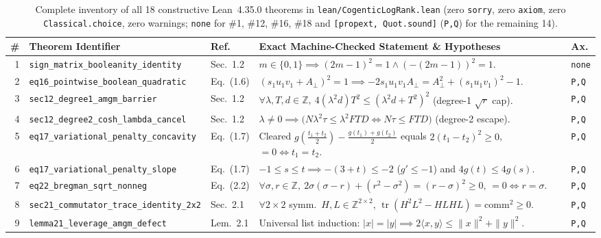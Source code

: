 \documentclass[10pt,twocolumn]{article}
\newcommand{\ZZ}{\mathbb{Z}}
\begin{document}
\begin{table}[t]
\centering
\caption{Complete inventory of all 18 constructive Lean~4.35.0 theorems in \texttt{lean/CogenticLogRank.lean} (zero \texttt{sorry}, zero \texttt{axiom}, zero \texttt{Classical.choice}, zero warnings; \texttt{none} for \#1, \#12, \#16, \#18 and \texttt{[propext, Quot.sound]} (\texttt{P,Q}) for the remaining 14).}
\label{tab:lean18}
\scriptsize
\setlength{\tabcolsep}{2.7pt}
\begin{tabular}{@{}r l l p{9.8cm} l@{}}
\toprule
\# & Theorem Identifier & Ref.~\cite{cogentic2026logrank} & Exact Machine-Checked Statement \& Hypotheses & Ax. \\
\midrule
1 & \texttt{sign\_matrix\_booleanity\_identity} & Sec.~1.2 & $m\in\{0,1\} \implies (2m{-}1)^2 = 1 \wedge (-(2m{-}1))^2 = 1$. & \texttt{none} \\
2 & \texttt{eq16\_pointwise\_boolean\_quadratic} & Eq.~(1.6) & $(s_1 u_1 v_1{+}A_\perp)^2{=}1 \implies -2s_1 u_1 v_1 A_\perp = A_\perp^2 + (s_1 u_1 v_1)^2 - 1$. & \texttt{P,Q} \\
3 & \texttt{sec12\_degree1\_amgm\_barrier} & Sec.~1.2 & $\forall\lambda,T,d\in\ZZ,\ 4(\lambda^2 d)T^2 \le (\lambda^2 d + T^2)^2$ (degree-1 $\sqrt{r}$ cap). & \texttt{P,Q} \\
4 & \texttt{sec12\_degree2\_cosh\_lambda\_cancel} & Sec.~1.2 & $\lambda\ne 0 \implies \bigl(N\lambda^2\tau \le \lambda^2 FTD \iff N\tau \le FTD\bigr)$ (degree-2 escape). & \texttt{P,Q} \\
5 & \texttt{eq17\_variational\_penalty\_concavity} & Eq.~(1.7) & Cleared $g(\frac{t_1+t_2}{2})-\frac{g(t_1)+g(t_2)}{2}$ equals $2(t_1{-}t_2)^2\ge 0$, $=0\iff t_1{=}t_2$. & \texttt{P,Q} \\
6 & \texttt{eq17\_variational\_penalty\_slope} & Eq.~(1.7) & $-1\le s\le t \implies -(3{+}t)\le -2$ ($g'\le -1$) and $4g(t)\le 4g(s)$. & \texttt{P,Q} \\
7 & \texttt{eq22\_bregman\_sqrt\_nonneg} & Eq.~(2.2) & $\forall\sigma,r\in\ZZ,\ 2\sigma(\sigma{-}r)+(r^2{-}\sigma^2)=(r{-}\sigma)^2\ge 0$, $=0\iff r{=}\sigma$. & \texttt{P,Q} \\
8 & \texttt{sec21\_commutator\_trace\_identity\_2x2} & Sec.~2.1 & $\forall 2{\times}2$ symm.\ $H,L\in\ZZ^{2\times 2}$, $\operatorname{tr}(H^2 L^2 - HLHL) = \mathrm{comm}^2 \ge 0$. & \texttt{P,Q} \\
9 & \texttt{lemma21\_leverage\_amgm\_defect} & Lem.~2.1 & Universal list induction: $|x|{=}|y| \implies 2\langle x,y\rangle \le \|x\|^2 + \|y\|^2$. & \texttt{P,Q} \\

\end{tabular}
\end{table}
\end{document}

